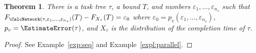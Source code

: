 \documentclass{article}
\newtheorem{theorem}{Theorem}
\newtheorem{lemma}{Lemma}
\begin{document}
%
%


\begin{theorem}\label{theorem:tight}
There is a task tree $\tau$, a bound $T$, and numbers $\varepsilon_1, \dots, \varepsilon_{n_s}$ 
such that $F_{\CalcNetwork(\tau, \varepsilon_1, \dots, \varepsilon_{n_s})}( T) - F_{X_\tau}(T) = \varepsilon_0$ where $\varepsilon_0=p_v(\varepsilon_1, \dots, \varepsilon_{n_s}) $,
$p_v=\EstimateError(\tau)$, and $X_\tau$ is the distribution of the completion time of $\tau$. 
\end{theorem}
\begin{proof}
See Example~\ref{exp:seq} and Example~\ref{expl:parallel}.
\end{proof}

\end{document}
